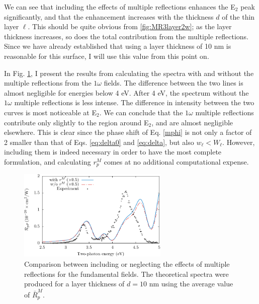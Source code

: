 We can see that including the effects of multiple reflections enhances the
E$_{2}$ peak significantly, and that the enhancement increases with the
thickness $d$ of the thin layer $\ell$. This should be quite obvious from
\ref{fig:MR3layer2w}; as the layer thickness increases, so does the total
contribution from the multiple reflections. Since we have already established
that using a layer thickness of 10 nm is reasonable for this surface, I will use
this value from this point on.

In Fig. \ref{fig:mr21w}, I present the results from calculating the spectra with
and without the multiple reflections from the $1\omega$ fields. The difference
between the two lines is almost negligible for energies below 4 eV. After 4 eV,
the spectrum without the $1\omega$ multiple reflections is less intense. The
difference in intensity between the two curves is most noticeable at E$_{2}$. We
can conclude that the $1\omega$ multiple reflections contribute only slightly to
the region around E$_{2}$, and are almost negligible elsewhere. This is clear
since the phase shift of Eq. \eqref{mphi} is not only a factor of 2 smaller than
that of Eqs. \eqref{eq:delta0} and \eqref{eq:delta}, but also $w_\ell < W_\ell$.
However, including them is indeed necessary in order to have the most complete
formulation, and calculating $r^{M}_{p}$ comes at no additional computational
expense.

\begin{figure}[b]
\centering
\includegraphics[width=0.64\textwidth]{content/figures/fig-Si1x1-MRno1w}
\caption[Including or neglecting the effects of multiple reflections for the
fundamental fields]
{Comparison between including or neglecting the effects of multiple
reflections for the fundamental fields. The theoretical spectra were produced
for a layer thickness of $d = 10$ nm using the average value of
$\bar{R}^{M}_{p}$.}
\label{fig:mr21w}
\end{figure}

